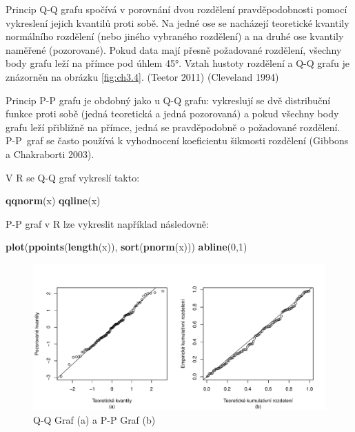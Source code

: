 \documentclass[12pt,]{article}
\newenvironment{Shaded}{\begin{snugshade}}{\end{snugshade}}
\newcommand{\KeywordTok}[1]{\textcolor[rgb]{0.13,0.29,0.53}{\textbf{#1}}}
\newcommand{\DecValTok}[1]{\textcolor[rgb]{0.00,0.00,0.81}{#1}}
\newcommand{\NormalTok}[1]{#1}
\begin{document}
\qquad Princip Q-Q grafu spočívá v porovnání dvou rozdělení
pravděpodobnosti pomocí vykreslení jejich kvantilů proti sobě. Na jedné
ose se nacházejí teoretické kvantily normálního rozdělení (nebo jiného
vybraného rozdělení) a na druhé ose kvantily naměřené (pozorované).
Pokud data mají přesně požadované rozdělení, všechny body grafu leží na
přímce pod úhlem 45°. Vztah hustoty rozdělení a Q-Q grafu je znázorněn
na obrázku \ref{fig:ch3.4}. (Teetor 2011) (Cleveland 1994)

\qquad Princip P-P grafu je obdobný jako u Q-Q grafu: vykreslují se dvě
distribuční funkce proti sobě (jedná teoretická a jedná pozorovaná) a
pokud všechny body grafu leží přibližně na přímce, jedná se
pravděpodobně o požadované rozdělení. \mbox{P-P}~graf se často používá k
vyhodnocení koeficientu šikmosti rozdělení (Gibbons a Chakraborti 2003).

V R se Q-Q graf vykreslí takto:

\begin{Shaded}
\begin{Highlighting}[]
\KeywordTok{qqnorm}\NormalTok{(x)}
\KeywordTok{qqline}\NormalTok{(x)}
\end{Highlighting}
\end{Shaded}

P-P graf v R lze vykreslit například následovně:

\begin{Shaded}
\begin{Highlighting}[]
\KeywordTok{plot}\NormalTok{(}\KeywordTok{ppoints}\NormalTok{(}\KeywordTok{length}\NormalTok{(x)), }\KeywordTok{sort}\NormalTok{(}\KeywordTok{pnorm}\NormalTok{(x)))}
\KeywordTok{abline}\NormalTok{(}\DecValTok{0}\NormalTok{,}\DecValTok{1}\NormalTok{)}
\end{Highlighting}
\end{Shaded}

\begin{figure}[H]

{\centering \includegraphics{BP_files/figure-latex/pp-qq plots-1} 

}

\caption{\label{fig:ch2.3} Q-Q Graf (a) a P-P Graf (b)}\label{fig:pp-qq plots}
\end{figure}
\end{document}
